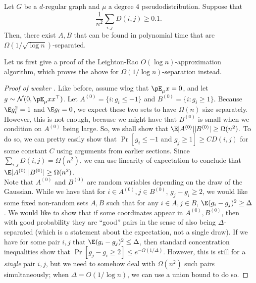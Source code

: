 	\begin{ftheo}
		\label{arv-glob-struct}
		Let $G$ be a $d$-regular graph and $\mu$ a degree $4$ pseudodistribution. Suppose that
		\[ \frac{1}{n^2} \sum_{i,j} D(i,j) \ge 0.1. \]
		Then, there exist $A,B$ that can be found in polynomial time that are $\Omega(1/\sqrt{\log n})$-separated.
	\end{ftheo}
	Let us first give a proof of the Leighton-Rao $O(\log n)$-approximation algorithm, which proves the above for $\Omega(1/\log n)$-separation instead.
	\begin{proof}[Proof of weaker ]
		Like before, assume wlog that $\pE_\mu x = 0$, and let $g \sim \mathcal{N}(0,\pE_\mu xx^\top)$. Let $A^{(0)} = \{i : g_i \le -1\}$ and $B^{(0)} = \{i : g_i \ge 1\}$. Because $\E g_i^2 = 1$ and $\E g_i = 0$, we expect these two sets to have $\Omega(n)$ size separately. However, this is not enough, because we might have that $B^{(0)}$ is small when we condition on $A^{(0)}$ being large. So, we shall show that $\E |A^{(0)}||B^{(0)}| \ge \Omega(n^2)$. To do so, we can pretty easily show that $\Pr[g_i \le -1 \text{ and } g_j \ge 1] \ge C D(i,j)$ for some constant $C$ using arguments from earlier sections. Since $\sum_{i,j} D(i,j) = \Omega(n^2)$, we can use linearity of expectation to conclude that $\E |A^{(0)}||B^{(0)}| \ge \Omega(n^2)$.\\
		Note that $A^{(0)}$ and $B^{(0)}$ are random variables depending on the draw of the Gaussian. While we have that for $i \in A^{(0)}, j \in B^{(0)}$, $g_j - g_i \ge 2$, we would like some fixed non-random sets $A,B$ such that for any $i \in A, j \in B$, $\E (g_i - g_j)^2 \ge \Delta$. We would like to show that if some coordinates appear in $A^{(0)},B^{(0)}$, then with good probability they are ``good'' pairs in the sense of also being $\Delta$-separated (which is a statement about the expectation, not a single draw). If we have for some pair $i,j$ that $\E (g_i - g_j)^2 \le \Delta$, then standard concentration inequalities show that $\Pr[g_j - g_i \ge 2] \le e^{-\Omega(1/\Delta)}$. However, this is still for a \emph{single} pair $i,j$, but we need to somehow deal with $\Omega(n^2)$ such pairs simultaneously; when $\Delta = O(1/\log n)$, we can use a union bound to do so.
	\end{proof}

